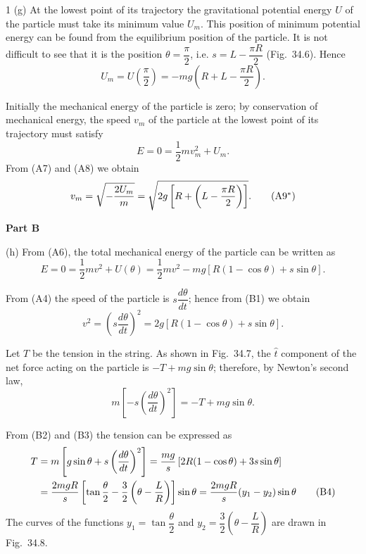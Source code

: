 \begin{solution}{1}
(g) At the lowest point of its trajectory the gravitational potential energy $U$ of the particle must take its minimum value $U_m$. This position of minimum potential energy can be found from the equilibrium position of the particle. It is not difficult to see that it is the position $\theta=\dfrac{\pi}{2}$, i.e. $s=L-\dfrac{\pi R}{2}$ (Fig.~34.6). Hence
\begin{equation}
U_m=U\left(\frac{\pi}{2}\right)=-mg\left(R+L-\frac{\pi R}{2}\right). \tag{A7}
\end{equation}

Initially the mechanical energy of the particle is zero; by conservation of mechanical energy, the speed $v_m$ of the particle at the lowest point of its trajectory must satisfy
\begin{equation}
E=0=\frac{1}{2}mv_m^2+U_m . \tag{A8}
\end{equation}
From (A7) and (A8) we obtain
\begin{equation}
v_m=\sqrt{-\frac{2U_m}{m}}=\sqrt{2g\left[R+\left(L-\frac{\pi R}{2}\right)\right]}. \tag{A9$^{*}$}
\end{equation}

\textbf{Part B}

(h) From (A6), the total mechanical energy of the particle can be written as
\begin{equation}
E=0=\frac{1}{2}mv^2+U(\theta)=\frac{1}{2}mv^2-mg\left[R(1-\cos\theta)+s\sin\theta\right]. \tag{B1}
\end{equation}

From (A4) the speed of the particle is $s\dfrac{d\theta}{dt}$; hence from (B1) we obtain
\begin{equation}
v^2=\left(s\frac{d\theta}{dt}\right)^2=2g\left[R(1-\cos\theta)+s\sin\theta\right]. \tag{B2}
\end{equation}

Let $T$ be the tension in the string. As shown in Fig.~34.7, the $\hat{t}$ component of the net force acting on the particle is $-T+mg\sin\theta$; therefore, by Newton's second law,
\begin{equation}
m\left[-s\left(\frac{d\theta}{dt}\right)^2\right]=-T+mg\sin\theta . \tag{B3}
\end{equation}

From (B2) and (B3) the tension can be expressed as
\begin{align}
T&=m\left[g\sin\theta+s\left(\frac{d\theta}{dt}\right)^2\right]
=\frac{mg}{s}\left[2R(1-\cos\theta)+3s\sin\theta\right]\notag\\
&=\frac{2mgR}{s}\left[\tan\frac{\theta}{2}-\frac{3}{2}\left(\theta-\frac{L}{R}\right)\right]\sin\theta
=\frac{2mgR}{s}(y_1-y_2)\sin\theta \tag{B4}
\end{align}
The curves of the functions $y_1=\tan\dfrac{\theta}{2}$ and $y_2=\dfrac{3}{2}\left(\theta-\dfrac{L}{R}\right)$ are drawn in Fig.~34.8.


\end{solution}

